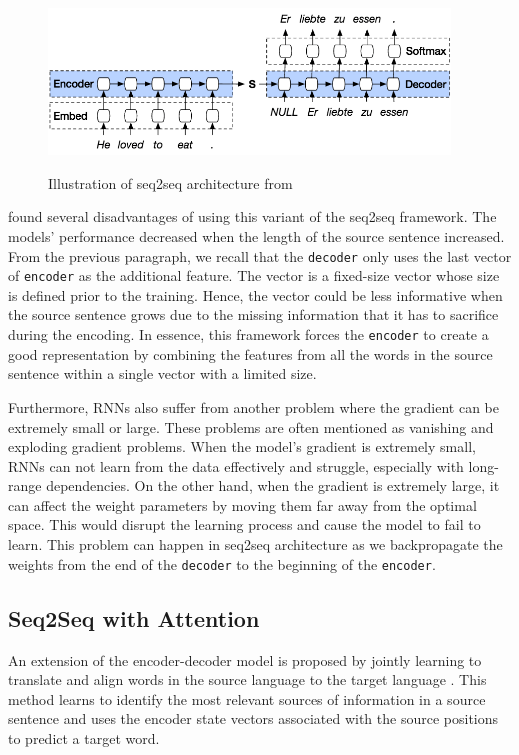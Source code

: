 \begin{figure}[h]
    {\includegraphics[width=0.95\textwidth]{img/rnnseq2seq.png}}
    \centering
    \caption{Illustration of seq2seq architecture from }
    \label{img:rnnseq2seq}
\end{figure}

 found several disadvantages of using this variant of the seq2seq framework. The models' performance decreased when the length of the source sentence increased. From the previous paragraph, we recall that the \texttt{decoder} only uses the last vector of \texttt{encoder} as the additional feature.
The vector is a fixed-size vector whose size is defined prior to the training. Hence, the vector could be less informative when the source sentence grows due to the missing information that it has to sacrifice during the encoding. In essence, this framework forces the \texttt{encoder} to create a good representation by combining the features from all the words in the source sentence within a single vector with a limited size.


Furthermore, RNNs also suffer from another problem where the gradient can be extremely small or large. These problems are often mentioned as vanishing and exploding gradient problems. When the model's gradient is extremely small, RNNs can not learn from the data effectively and struggle, especially with long-range dependencies. On the other hand, when the gradient is extremely large, it can affect the weight parameters by moving them far away from the optimal space. This would disrupt the learning process and cause the model to fail to learn. This problem can happen in seq2seq architecture as we backpropagate the weights from the end of the \texttt{decoder} to the beginning of the \texttt{encoder}.

\subsection{Seq2Seq with Attention}
An extension of the encoder-decoder model is proposed by jointly learning to translate and align words in the source language to the target language . This method learns to identify the most relevant sources of information in a source sentence and uses the encoder state vectors associated with the source positions to predict a target word.

